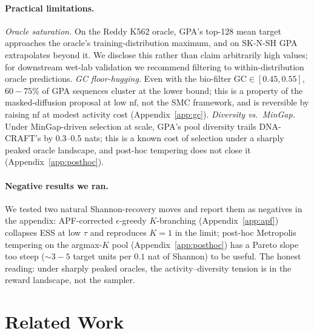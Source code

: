 \documentclass{article}
\theoremstyle{definition}
\theoremstyle{remark}
\newcommand{\gpa}{\textsc{GPA}\xspace}
\newcommand{\dnacraft}{\textsc{DNA-CRAFT}\xspace}
\begin{document}
\paragraph{Practical limitations.}
\emph{Oracle saturation.} On the Reddy K562 oracle, \gpa{}'s top-128 mean target approaches the oracle's training-distribution maximum, and on SK-N-SH \gpa{} extrapolates beyond it. We disclose this rather than claim arbitrarily high values; for downstream wet-lab validation we recommend filtering to within-distribution oracle predictions. \emph{GC floor-hugging.} Even with the bio-filter $\mathrm{GC}\!\in\![0.45,0.55]$, $60\!-\!75\%$ of \gpa{} sequences cluster at the lower bound; this is a property of the masked-diffusion proposal at low $\mathrm{nf}$, not the SMC framework, and is reversible by raising $\mathrm{nf}$ at modest activity cost (Appendix~\ref{app:gc}). \emph{Diversity vs.\ MinGap.} Under MinGap-driven selection at scale, \gpa{}'s pool diversity trails \dnacraft{}'s by 0.3–0.5 nats; this is a known cost of selection under a sharply peaked oracle landscape, and post-hoc tempering does not close it (Appendix~\ref{app:posthoc}).

\paragraph{Negative results we ran.}\label{sec:disc:diversity}
We tested two natural Shannon-recovery moves and report them as negatives in the appendix: APF-corrected $\epsilon$-greedy $K$-branching (Appendix~\ref{app:apf}) collapses ESS at low $\tau$ and reproduces $K\!=\!1$ in the limit; post-hoc Metropolis tempering on the argmax-$K$ pool (Appendix~\ref{app:posthoc}) has a Pareto slope too steep ($\sim\!3\!-\!5$ target units per $0.1$ nat of Shannon) to be useful. The honest reading: under sharply peaked oracles, the activity–diversity tension is in the reward landscape, not the sampler.

\section{Related Work}\label{sec:related}
\end{document}
